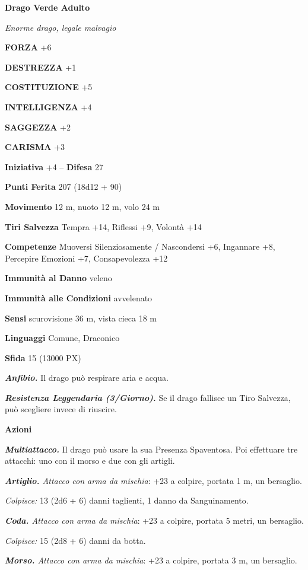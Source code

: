 \begin{multicols}{2}
	\medskip{}\textbf{Drago Verde Adulto}

	\textit{Enorme drago, legale malvagio}

	\textbf{FORZA} +6

	\textbf{DESTREZZA} +1

	\textbf{COSTITUZIONE} +5

	\textbf{INTELLIGENZA} +4

	\textbf{SAGGEZZA} +2

	\textbf{CARISMA} +3

	\textbf{Iniziativa} +4 -- \textbf{Difesa} 27

	\textbf{Punti Ferita} 207 (18d12 + 90)

	\textbf{Movimento} 12 m, nuoto 12 m, volo 24 m

	\textbf{Tiri Salvezza} Tempra +14, Riflessi +9, Volontà +14

	\textbf{Competenze} Muoversi Silenziosamente / Nascondersi +6, Ingannare +8, Percepire Emozioni +7, Consapevolezza +12

	\textbf{Immunità al Danno} veleno

	\textbf{Immunità alle Condizioni} avvelenato

	\textbf{Sensi} scurovisione 36 m, vista cieca 18 m

	\textbf{Linguaggi} Comune, Draconico

	\textbf{Sfida} 15 (13000 PX)

	\textit{\textbf{Anfibio.}} Il drago può respirare aria e acqua.

	\textit{\textbf{Resistenza Leggendaria (3/Giorno).}} Se il drago fallisce un Tiro Salvezza, può scegliere invece di riuscire.

	\textbf{Azioni}

	\textit{\textbf{Multiattacco.}} Il drago può usare la sua Presenza Spaventosa. Poi effettuare tre attacchi: uno con il morso e due con gli artigli.

	\textit{\textbf{Artiglio.} Attacco con arma da mischia}: +23 a colpire, portata 1 m, un bersaglio.

	\textit{Colpisce:} 13 (2d6 + 6) danni taglienti, 1 danno da Sanguinamento.

	\textit{\textbf{Coda.} Attacco con arma da mischia}: +23 a colpire, portata 5 metri, un bersaglio.

	\textit{Colpisce:} 15 (2d8 + 6) danni da botta.

	\textit{\textbf{Morso.} Attacco con arma da mischia}: +23 a colpire, portata 3 m, un bersaglio.


\end{multicols}
